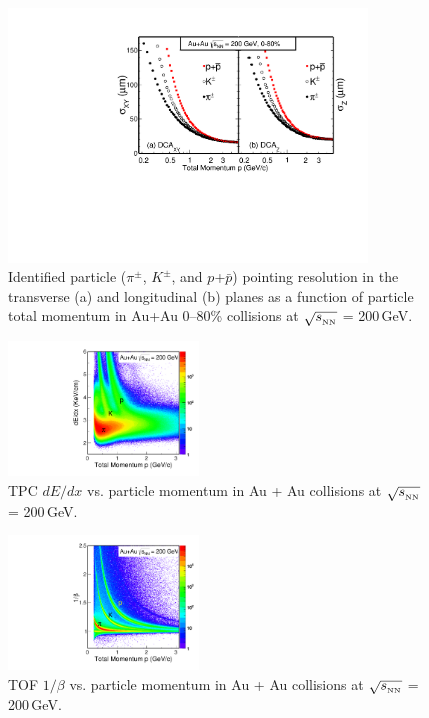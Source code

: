 \documentclass[%
 reprint,	
 amsmath,amssymb,
 aps,
 prc,
]{revtex4-1}
\begin{document}
\begin{figure}
\centering
\includegraphics[width=0.85\textwidth]{fig/DCAXy_Z.pdf}
\caption{Identified particle ($\pi^{\pm}$, $K^{\pm}$, and $p$+$\bar{p}$) pointing resolution in the transverse (a) and longitudinal (b) planes as a function of particle total momentum in Au+Au 0--80\% collisions at $\sqrt{s_{_{\rm NN}}}$ = 200\,GeV.}
\label{fig:DCAXy_Z} 
\end{figure}

\begin{figure}[h]
\centering
\includegraphics[width=0.45\textwidth]{fig/PID_dEdx.pdf}
\caption{TPC $dE/dx$ vs. particle momentum in Au + Au collisions at $\sqrt{s_{_{\rm NN}}}$ = 200\,GeV.}
\label{fig:PID_dEdx} 
\end{figure}

\begin{figure}[h]
\centering
\includegraphics[width=0.45\textwidth]{fig/PID_beta.pdf}
\caption{TOF $1/\beta$ vs. particle momentum in Au + Au collisions at $\sqrt{s_{_{\rm NN}}}$ = 200\,GeV.}
\label{fig:PID_beta} 
\end{figure}
\end{document}
